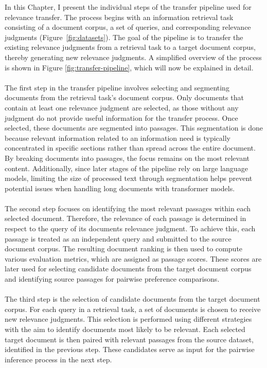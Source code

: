 In this Chapter, I present the individual steps of the transfer pipeline used for relevance transfer. The process begins with an information retrieval task consisting of a document corpus, a set of queries, and corresponding relevance judgments (Figure~\ref{fig:datasets}). The goal of the pipeline is to transfer the existing relevance judgments from a retrieval task to a target document corpus, thereby generating new relevance judgments. A simplified overview of the process is shown in Figure \ref{fig:transfer-pipeline}, which will now be explained in detail.
\\\\
The first step in the transfer pipeline involves selecting and segmenting documents from the retrieval task's document corpus. Only documents that contain at least one relevance judgment are selected, as those without any judgment do not provide useful information for the transfer process. Once selected, these documents are segmented into passages. This segmentation is done because relevant information related to an information need is typically concentrated in specific sections rather than spread across the entire document. By breaking documents into passages, the focus remains on the most relevant content. Additionally, since later stages of the pipeline rely on large language models, limiting the size of processed text through segmentation helps prevent potential issues when handling long documents with transformer models.
\\\\
The second step focuses on identifying the most relevant passages within each selected document. Therefore, the relevance of each passage is determined in respect to the query of its documents relevance judgment. To achieve this, each passage is treated as an independent query and submitted to the source document corpus. The resulting document ranking is then used to compute various evaluation metrics, which are assigned as passage scores. These scores are later used for selecting candidate documents from the target document corpus and identifying source passages for pairwise preference comparisons.
\\\\
The third step is the selection of candidate documents from the target document corpus. For each query in a retrieval task, a set of documents is chosen to receive new relevance judgments. This selection is performed using different strategies with the aim to identify documents most likely to be relevant. Each selected target document is then paired with relevant passages from the source dataset, identified in the previous step. These candidates serve as input for the pairwise inference process in the next step.
